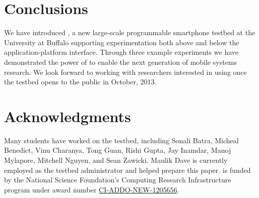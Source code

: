 \section{Conclusions}
\label{sec-conclusions}

We have introduced \PhoneLab{}, a new large-scale programmable smartphone
testbed at the University at Buffalo supporting experimentation both above
and below the application-platform interface. Through three example
experiments we have demonstrated the power of \PhoneLab{} to enable the next
generation of mobile systems research. We look forward to working with
researchers interested in using \PhoneLab{} once the testbed opens to the
public in October, 2013.

\section*{Acknowledgments}

Many students have worked on the \PhoneLab{} testbed, including Sonali Batra,
Micheal Benedict, Vinu Charanya, Tong Guan, Rishi Gupta, Jay Inamdar, Manoj
Mylapore, Mitchell Nguyen, and Sean Zawicki. Maulik Dave is currently
employed as the testbed administrator and helped prepare this paper.
\PhoneLab{} is funded by the National Science Foundation's Computing Research
Infrastructure program under award number
\href{http://www.nsf.gov/awardsearch/showAward?AWD\_ID=1205656}{CI-ADDO-NEW-1205656}.
